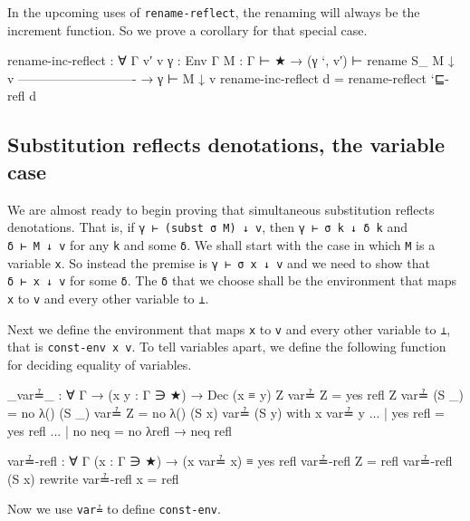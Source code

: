 In the upcoming uses of \texttt{rename-reflect}, the renaming will
always be the increment function. So we prove a corollary for that
special case.

\begin{fence}
\begin{code}
rename-inc-reflect : ∀ {Γ v′ v} {γ : Env Γ} { M : Γ ⊢ ★}
  → (γ `, v′) ⊢ rename S_ M ↓ v
    ----------------------------
  → γ ⊢ M ↓ v
rename-inc-reflect d = rename-reflect `⊑-refl d
\end{code}
\end{fence}

\hypertarget{substitution-reflects-denotations-the-variable-case}{%
\subsection{Substitution reflects denotations, the variable
case}\label{substitution-reflects-denotations-the-variable-case}}

We are almost ready to begin proving that simultaneous substitution
reflects denotations. That is, if \texttt{γ\ ⊢\ (subst\ σ\ M)\ ↓\ v},
then \texttt{γ\ ⊢\ σ\ k\ ↓\ δ\ k} and \texttt{δ\ ⊢\ M\ ↓\ v} for any
\texttt{k} and some \texttt{δ}. We shall start with the case in which
\texttt{M} is a variable \texttt{x}. So instead the premise is
\texttt{γ\ ⊢\ σ\ x\ ↓\ v} and we need to show that
\texttt{δ\ ⊢\ x\ ↓\ v} for some \texttt{δ}. The \texttt{δ} that we
choose shall be the environment that maps \texttt{x} to \texttt{v} and
every other variable to \texttt{⊥}.

Next we define the environment that maps \texttt{x} to \texttt{v} and
every other variable to \texttt{⊥}, that is \texttt{const-env\ x\ v}. To
tell variables apart, we define the following function for deciding
equality of variables.

\begin{fence}
\begin{code}
_var≟_ : ∀ {Γ} → (x y : Γ ∋ ★) → Dec (x ≡ y)
Z var≟ Z  =  yes refl
Z var≟ (S _)  =  no λ()
(S _) var≟ Z  =  no λ()
(S x) var≟ (S y) with  x var≟ y
...                 |  yes refl =  yes refl
...                 |  no neq   =  no λ{refl → neq refl}

var≟-refl : ∀ {Γ} (x : Γ ∋ ★) → (x var≟ x) ≡ yes refl
var≟-refl Z = refl
var≟-refl (S x) rewrite var≟-refl x = refl
\end{code}
\end{fence}

Now we use \texttt{var≟} to define \texttt{const-env}.

